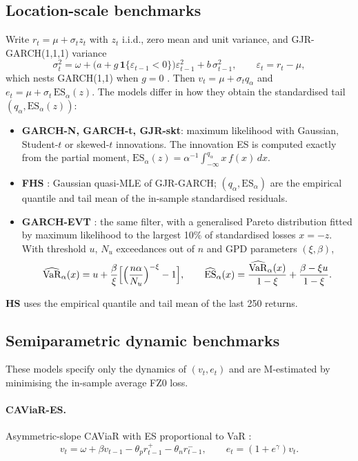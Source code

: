 \documentclass[11pt]{article}
\theoremstyle{remark}
\newcommand{\1}{\mathbf{1}}
\newcommand{\VaR}{\mathrm{VaR}}
\newcommand{\ES}{\mathrm{ES}}
\begin{document}
\subsection{Location-scale benchmarks}
Write $r_t=\mu+\sigma_tz_t$ with $z_t$ i.i.d., zero mean and unit variance, and GJR-GARCH(1,1,1) variance \citep{glosten1993relation}
\begin{equation}
\sigma_t^2=\omega+\bigl(a+g\,\1\{\varepsilon_{t-1}<0\}\bigr)\varepsilon_{t-1}^2+b\,\sigma_{t-1}^2,\qquad \varepsilon_t=r_t-\mu ,
\end{equation}
which nests GARCH(1,1) when $g=0$ \citep{bollerslev1986garch}. Then $v_t=\mu+\sigma_tq_\alpha$ and $e_t=\mu+\sigma_t\,\mathrm{ES}_\alpha(z)$. The models differ in how they obtain the standardised tail $(q_\alpha,\mathrm{ES}_\alpha(z))$:
\begin{itemize}
\item \textbf{GARCH-N, GARCH-t, GJR-skt}: maximum likelihood with Gaussian, Student-$t$ or \citet{hansen1994autoregressive} skewed-$t$ innovations. The innovation ES is computed exactly from the partial moment, $\mathrm{ES}_\alpha(z)=\alpha^{-1}\int_{-\infty}^{q_\alpha}x\,f(x)\,dx$.
\item \textbf{FHS} \citep{baroneadesi1999var}: Gaussian quasi-MLE of GJR-GARCH; $(q_\alpha,\mathrm{ES}_\alpha)$ are the empirical quantile and tail mean of the in-sample standardised residuals.
\item \textbf{GARCH-EVT} \citep{mcneil2000estimation}: the same filter, with a generalised Pareto distribution fitted by maximum likelihood to the largest 10\% of standardised losses $x=-z$. With threshold $u$, $N_u$ exceedances out of $n$ and GPD parameters $(\xi,\beta)$,
\begin{equation}
\widehat{\VaR}_\alpha(x)=u+\frac{\beta}{\xi}\Bigl[\Bigl(\frac{n\alpha}{N_u}\Bigr)^{-\xi}-1\Bigr],\qquad
\widehat{\ES}_\alpha(x)=\frac{\widehat{\VaR}_\alpha(x)}{1-\xi}+\frac{\beta-\xi u}{1-\xi}.
\end{equation}
\end{itemize}
\textbf{HS} uses the empirical quantile and tail mean of the last 250 returns.

\subsection{Semiparametric dynamic benchmarks}
These models specify only the dynamics of $(v_t,e_t)$ and are M-estimated by minimising the in-sample average FZ0 loss.

\paragraph{CAViaR-ES.} Asymmetric-slope CAViaR \citep{engle2004caviar} with ES proportional to VaR \citep{taylor2019forecasting}:
\[
v_t=\omega+\beta v_{t-1}-\theta_p r_{t-1}^+-\theta_n r_{t-1}^-,\qquad e_t=(1+e^{\gamma})v_t .
\]
\end{document}
